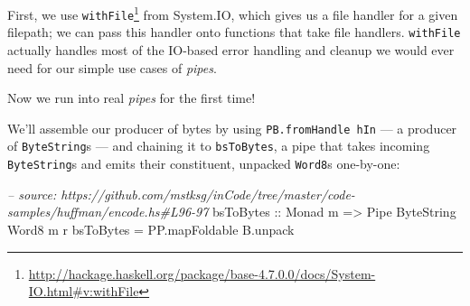 \documentclass[]{article}
\newenvironment{Shaded}{\begin{snugshade}}{\end{snugshade}}
\newcommand{\CommentTok}[1]{\textcolor[rgb]{0.56,0.35,0.01}{\textit{#1}}}
\newcommand{\DataTypeTok}[1]{\textcolor[rgb]{0.13,0.29,0.53}{#1}}
\newcommand{\DecValTok}[1]{\textcolor[rgb]{0.00,0.00,0.81}{#1}}
\newcommand{\FunctionTok}[1]{\textcolor[rgb]{0.00,0.00,0.00}{#1}}
\newcommand{\KeywordTok}[1]{\textcolor[rgb]{0.13,0.29,0.53}{\textbf{#1}}}
\newcommand{\NormalTok}[1]{#1}
\newcommand{\OtherTok}[1]{\textcolor[rgb]{0.56,0.35,0.01}{#1}}
\renewcommand{\href}[2]{#2\footnote{\url{#1}}}
\begin{document}
\begin{Shaded}
\end{Shaded}

First, we use
\href{http://hackage.haskell.org/package/base-4.7.0.0/docs/System-IO.html\#v:withFile}{\texttt{withFile}}
from System.IO, which gives us a file handler for a given filepath; we can pass
this handler onto functions that take file handlers. \texttt{withFile} actually
handles most of the IO-based error handling and cleanup we would ever need for
our simple use cases of \emph{pipes}.

Now we run into real \emph{pipes} for the first time!

We'll assemble our producer of bytes by using \texttt{PB.fromHandle\ hIn} --- a
producer of \texttt{ByteString}s --- and chaining it to \texttt{bsToBytes}, a
pipe that takes incoming \texttt{ByteString}s and emits their constituent,
unpacked \texttt{Word8}s one-by-one:

\begin{Shaded}
\begin{Highlighting}[]
\CommentTok{-- source: https://github.com/mstksg/inCode/tree/master/code-samples/huffman/encode.hs#L96-97}
\OtherTok{bsToBytes ::} \DataTypeTok{Monad}\NormalTok{ m }\OtherTok{=>} \DataTypeTok{Pipe} \DataTypeTok{ByteString} \DataTypeTok{Word8}\NormalTok{ m r}
\NormalTok{bsToBytes }\FunctionTok{=}\NormalTok{ PP.mapFoldable B.unpack}
\end{Highlighting}
\end{Shaded}
\end{document}
